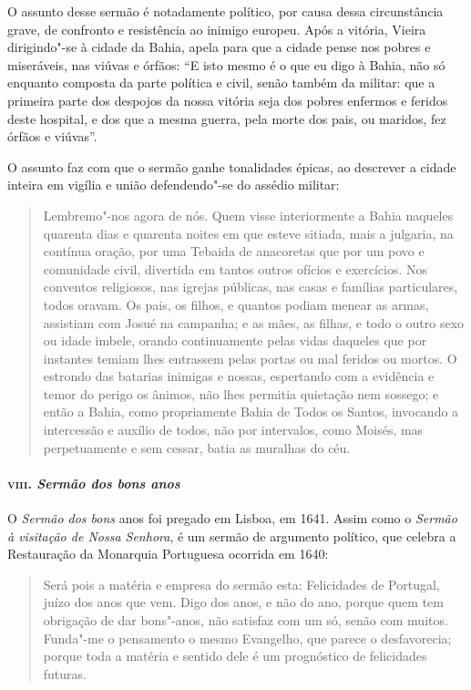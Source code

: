 O assunto desse sermão é notadamente político, por causa dessa
circunstância grave, de confronto e resistência ao inimigo europeu. Após
a vitória, Vieira dirigindo"-se à cidade da Bahia, apela para que a
cidade pense nos pobres e miseráveis, nas viúvas e órfãos: ``E isto
mesmo é o que eu digo à Bahia, não só enquanto composta da parte
política e civil, senão também da militar: que a primeira parte dos
despojos da nossa vitória seja dos pobres enfermos e feridos deste
hospital, e dos que a mesma guerra, pela morte dos pais, ou maridos, fez
órfãos e viúvas''.

O assunto faz com que o sermão ganhe tonalidades épicas, ao descrever a
cidade inteira em vigília e união defendendo"-se do assédio militar:

\begin{quote}
Lembremo"-nos agora de nós. Quem visse interiormente a Bahia naqueles
quarenta dias e quarenta noites em que esteve sitiada, mais a julgaria,
na contínua oração, por uma Tebaida de anacoretas que por um povo e
comunidade civil, divertida em tantos outros ofícios e exercícios. Nos
conventos religiosos, nas igrejas públicas, nas casas e famílias
particulares, todos oravam. Os pais, os filhos, e quantos podiam menear
as armas, assistiam com Josué na campanha; e as mães, as filhas, e todo
o outro sexo ou idade imbele, orando continuamente pelas vidas daqueles
que por instantes temiam lhes entrassem pelas portas ou mal feridos ou
mortos. O estrondo das batarias inimigas e nossas, espertando com a
evidência e temor do perigo os ânimos, não lhes permitia quietação nem
sossego; e então a Bahia, como propriamente Bahia de Todos os Santos,
invocando a intercessão e auxílio de todos, não por intervalos, como
Moisés, mas perpetuamente e sem cessar, batia as muralhas do céu.
\end{quote}

\paragraph{\textsc{viii}. \emph{Sermão dos bons anos}}

O \emph{Sermão dos bons} anos foi pregado em Lisboa, em 1641. Assim como
o \emph{Sermão à visitação de Nossa Senhora}, é um sermão de argumento
político, que celebra a Restauração da Monarquia Portuguesa ocorrida em
1640:

\begin{quote}
Será pois a matéria e empresa do sermão esta: Felicidades de Portugal,
juízo dos anos que vem. Digo dos anos, e não do ano, porque quem tem
obrigação de dar bons"-anos, não satisfaz com um só, senão com muitos.
Funda"-me o pensamento o mesmo Evangelho, que parece o desfavorecia;
porque toda a matéria e sentido dele é um prognóstico de felicidades
futuras.
\end{quote}

